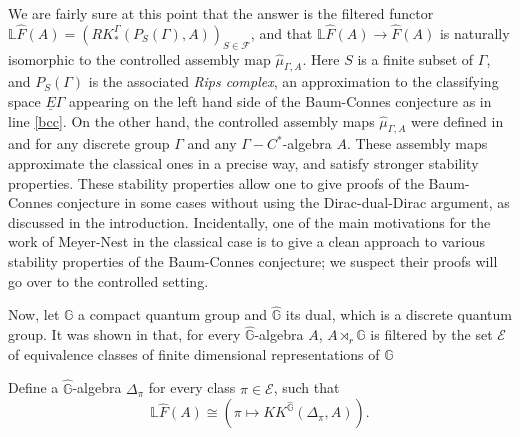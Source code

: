 We are fairly sure at this point that the answer is the filtered functor $\mathbb L \hat F(A) = (RK_*^\Gamma(P_S(\Gamma),A))_{S\in \mathcal{F}}$, and that $\mathbb L \hat F (A) \rightarrow \hat F(A)$ is naturally isomorphic to the controlled assembly map $\hat \mu_{\Gamma,A}$.  Here $S$ is a finite subset of $\Gamma$, and $P_S(\Gamma)$ is the associated \emph{Rips complex}, an approximation to the classifying space $\underline{E}\Gamma$ appearing on the left hand side of the Baum-Connes conjecture as in line \eqref{bcc}.  On the other hand, the controlled assembly maps $\hat\mu_{\Gamma,A}$ were defined in \cite{OY2} and \cite{DellAieraThesis} for any discrete group $\Gamma$ and any $\Gamma-C^*$-algebra $A$. These assembly maps approximate the classical ones in a precise way, and satisfy stronger stability properties. These stability properties allow one to give proofs of the Baum-Connes conjecture in some cases without using the Dirac-dual-Dirac argument, as discussed in the introduction.  Incidentally, one of the main motivations for the work of Meyer-Nest \cite{MeyerNest} in the classical case is to give a clean approach to various stability properties of the Baum-Connes conjecture; we suspect their proofs will go over to the controlled setting.

Now, let $\mathbb G$ a compact quantum group and $\hat{\mathbb G}$ its dual, which is a discrete quantum group. It was shown in \cite{DellAieraThesis} that, for every $\hat{\mathbb G}$-algebra $A$, $A\rtimes_r \hat{\mathbb G}$ is filtered by the set $\mathcal E$ of equivalence classes of finite dimensional representations of $\mathbb G$

\begin{project} Define a 
$ \hat{\mathbb G} $-algebra $\Delta_\pi$ for every class $\pi\in \mathcal E$, such that 
\[\mathbb L \hat F(A) \cong (\pi\mapsto KK^{\hat{\mathbb G}}(\Delta_\pi,A)).\]   
\end{project}

